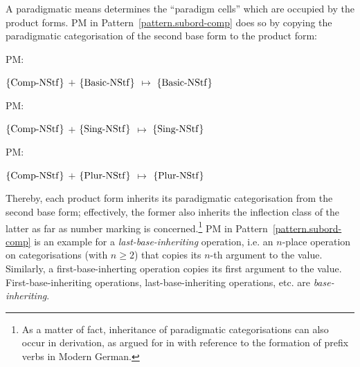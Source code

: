 \documentclass[output=paper
  ,nobabel
  ,draftmode
  ,colorlinks, citecolor=brown
]{langscibook}
\begin{document}
\noindent
A paradigmatic means determines the ``paradigm cells'' which
are occupied by the product forms. PM in Pattern \ref{pattern.subord-comp} does so by copying the paradigmatic
categorisation of the second base form to the product form: \begin{exe}
\ex \begin{xlist}
\ex \raggedright
\begin{labeledlist}{PM:}
\item[PM:] \raggedright $\left\{\smash{\operatorname{Comp-NStf}}\right\}$ $+$ $\left\{\smash{\operatorname{Basic-NStf}}\right\}$ $↦$ $\left\{\smash{\operatorname{Basic-NStf}}\right\}$
\end{labeledlist}
\ex \raggedright
\begin{labeledlist}{PM:}
\item[PM:] \raggedright $\left\{\smash{\operatorname{Comp-NStf}}\right\}$ $+$ $\left\{\smash{\operatorname{Sing-NStf}}\right\}$ $↦$ $\left\{\smash{\operatorname{Sing-NStf}}\right\}$
\end{labeledlist}
\ex \raggedright
\begin{labeledlist}{PM:}
\item[PM:] \raggedright $\left\{\smash{\operatorname{Comp-NStf}}\right\}$ $+$ $\left\{\smash{\operatorname{Plur-NStf}}\right\}$ $↦$ $\left\{\smash{\operatorname{Plur-NStf}}\right\}$
\end{labeledlist}
\end{xlist}
\end{exe} 
Thereby, each product form inherits its paradigmatic
categorisation from the second base form; effectively, the former also inherits
the inflection class of the latter as far as number marking is
concerned.\footnote{As a matter of fact, inheritance of paradigmatic categorisations
can also occur in derivation, as argued for in \citet[367–368]{nolda:2019:wortbildung:flexion} with reference to the
formation of prefix verbs in Modern German.} PM in Pattern \ref{pattern.subord-comp} is an example for a
\emph{last-base-inheriting} operation, i.e. an $n$-place operation on categorisations (with $n≥2$) that copies its $n$-th argument to the value. Similarly, a first-base-inherting operation
copies its first argument to the value. First-base-inheriting operations,
last-base-inheriting operations, etc. are \emph{base-inheriting}.
\end{document}
